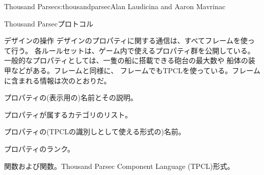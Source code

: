 \begin{aosachapter}{Thousand Parsec}{s:thousandparsec}{Alan Laudicina and Aaron Mavrinac}
\begin{aosasect1}{Thousand Parsecプロトコル}
\begin{aosasect2}{デザインの操作}
デザインのプロパティに関する通信は、すべてフレームを使って行う。
各ルールセットは、ゲーム内で使えるプロパティ群を公開している。
一般的なプロパティとしては、一隻の船に搭載できる砲台の最大数や
船体の装甲などがある。フレームと同様に、
フレームでもTPCLを使っている。フレームに含まれる情報は次のとおりだ。

\begin{aosaitemize}

  \item プロパティの(表示用の)名前とその説明。

  \item プロパティが属するカテゴリのリスト。

  \item プロパティの(TPCLの識別しとして使える形式の)名前。

  \item プロパティのランク。

  \item {}関数および関数。Thousand Parsec Component Language (TPCL)形式。

\end{aosaitemize}


\end{aosasect2}
\end{aosasect1}
\end{aosachapter}
